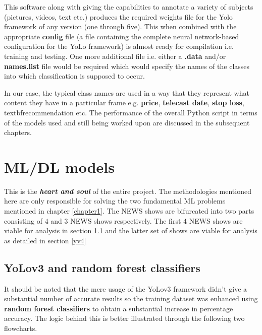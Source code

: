 This software along with giving the capabilities to annotate a
variety of subjects (pictures, videos, text etc.) produces the
required weights file for the Yolo framework of any version (one
through five). This when combined with the appropriate
{\selectfont \textbf{config}} file (a file containing
  the complete neural network-based configuration for the YoLo
framework) is almost ready for compilation i.e. training and testing.
One more additional file i.e. either a {\selectfont
\textbf{.data}} and/or {\selectfont
\textbf{names.list}} file would be required which would specify the
names of the classes into which classification is supposed to occur. \par

In our case, the typical class names are used in a way that they
represent what content they have in a particular frame e.g.
\textbf{price}, \textbf{telecast date}, \textbf{stop loss},
textbf{recommendation} etc. The performance of the overall Python
script in terms of the models used and still being worked upon are
discussed in the subsequent chapters.

\section{ML/DL models}

This is the \textbf{\textit{heart and soul}} of the entire project.
The methodologies mentioned here are only responsible for solving the
two fundamental ML problems mentioned in chapter \ref{chapter1}. The
NEWS shows are bifurcated into two parts consisting of $4$ and $3$
NEWS shows respectively. The first $4$ NEWS shows are viable for
analysis in section \ref{yv3} and the latter set of shows are viable
for analysis as detailed in section \ref{yv4}

\subsection{YoLov3 and random forest classifiers} \label{yv3}

It should be noted that the mere usage of the YoLov3 framework didn’t
give a substantial number of accurate results so the training dataset
was enhanced using \textbf{random forest classifiers} to obtain a
substantial increase in percentage accuracy. The logic behind this is
better illustrated through the following two flowcharts.

